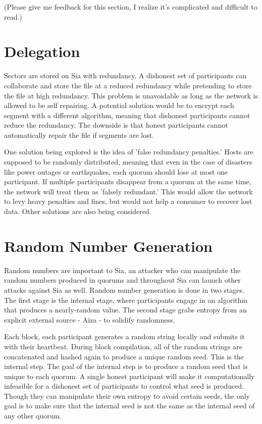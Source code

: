 \documentclass[twocolumn]{article}
\begin{document}
(Please give me feedback for this section, I realize it's complicated and difficult to read.)

\section{Delegation}
Sectors are stored on Sia with redundancy.
A dishonest set of participants can collaborate and store the file at a reduced redundancy while pretending to store the file at high redundancy.
This problem is unavoidable as long as the network is allowed to be self repairing.
A potential solution would be to encrypt each segment with a different algorithm, meaning that dishonest participants cannot reduce the redundancy.
The downside is that honest participants cannot automatically repair the file if segments are lost.

One solution being explored is the idea of 'false redundancy penalties.'
Hosts are supposed to be randomly distributed, meaning that even in the case of disasters like power outages or earthquakes, each quorum should lose at most one participant.
If multiple participants disappear from a quorum at the same time, the network will treat them as 'falsely redundant.'
This would allow the network to levy heavy penalties and fines, but would not help a consumer to recover lost data.
Other solutions are also being considered.

\section{Random Number Generation}
Random numbers are important to Sia, an attacker who can manipulate the random numbers produced in quorums and throughout Sia can launch other attacks against Sia as well.
Random number generation is done in two stages.
The first stage is the internal stage, where participants engage in an algorithm that produces a nearly-random value.
The second stage grabs entropy from an explicit external source - Aiza - to solidify randomness.

Each block, each participant generates a random string locally and submits it with their heartbeat.
During block compilation, all of the random strings are concatenated and hashed again to produce a unique random seed.
This is the internal step.
The goal of the internal step is to produce a random seed that is unique to each quorum.
A single honest participant will make it computationally infeasible for a dishonest set of participants to control what seed is produced.
Though they can manipulate their own entropy to avoid certain seeds, the only goal is to make sure that the internal seed is not the same as the internal seed of any other quorum.
\end{document}
